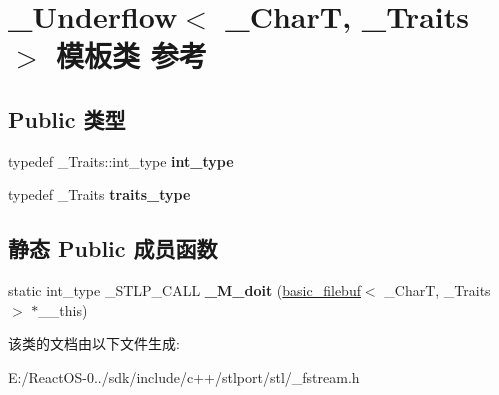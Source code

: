 \hypertarget{class___underflow}{}\section{\+\_\+\+Underflow$<$ \+\_\+\+CharT, \+\_\+\+Traits $>$ 模板类 参考}
\label{class___underflow}
\subsection*{Public 类型}
\begin{DoxyCompactItemize}
\item 
\mbox{\label{class___underflow_a80617cfe18c3e0f5813ea5069095f661}} 
typedef \+\_\+\+Traits\+::int\+\_\+type {\bfseries int\+\_\+type}
\item 
\mbox{\label{class___underflow_a2b554f2bf57fb30eeff77104b8493c65}} 
typedef \+\_\+\+Traits {\bfseries traits\+\_\+type}
\end{DoxyCompactItemize}
\subsection*{静态 Public 成员函数}
\begin{DoxyCompactItemize}
\item 
\mbox{\label{class___underflow_aabae863717710f5eab15c3d99c55f7b7}} 
static int\+\_\+type \+\_\+\+S\+T\+L\+P\+\_\+\+C\+A\+LL {\bfseries \+\_\+\+M\+\_\+doit} (\hyperlink{classbasic__filebuf}{basic\+\_\+filebuf}$<$ \+\_\+\+CharT, \+\_\+\+Traits $>$ $\ast$\+\_\+\+\_\+this)
\end{DoxyCompactItemize}


该类的文档由以下文件生成\+:\begin{DoxyCompactItemize}
\item 
E\+:/\+React\+O\+S-\/0../sdk/include/c++/stlport/stl/\+\_\+fstream.\+h\end{DoxyCompactItemize}
